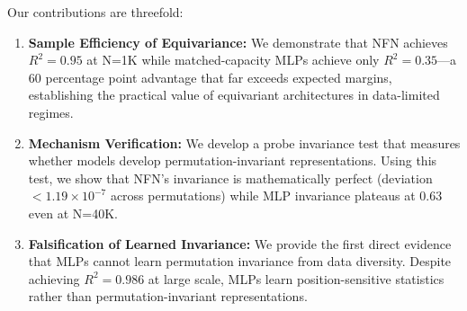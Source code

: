 Our contributions are threefold:

\begin{enumerate}
    \item \textbf{Sample Efficiency of Equivariance:} We demonstrate that NFN achieves $R^2=0.95$ at N=1K while matched-capacity MLPs achieve only $R^2=0.35$---a 60 percentage point advantage that far exceeds expected margins, establishing the practical value of equivariant architectures in data-limited regimes.

    \item \textbf{Mechanism Verification:} We develop a probe invariance test that measures whether models develop permutation-invariant representations. Using this test, we show that NFN's invariance is mathematically perfect (deviation $< 1.19 \times 10^{-7}$ across permutations) while MLP invariance plateaus at 0.63 even at N=40K.

    \item \textbf{Falsification of Learned Invariance:} We provide the first direct evidence that MLPs cannot learn permutation invariance from data diversity. Despite achieving $R^2=0.986$ at large scale, MLPs learn position-sensitive statistics rather than permutation-invariant representations.
\end{enumerate}
